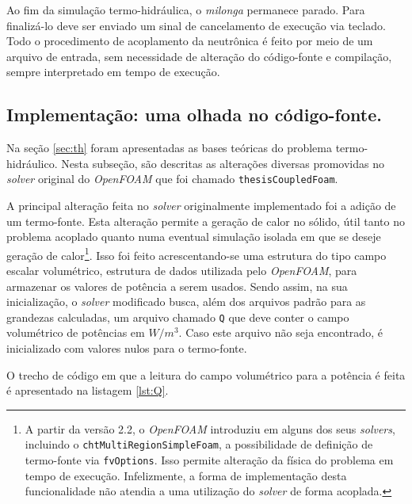 Ao fim da simulação termo-hidráulica, o \textit{milonga} permanece parado. Para finalizá-lo deve ser enviado um sinal de
cancelamento de execução via teclado. Todo o procedimento de acoplamento da neutrônica é feito por meio de um arquivo
de entrada, sem necessidade de alteração do código-fonte e compilação, sempre interpretado em tempo de execução.

\subsection{Implementação: uma olhada no código-fonte.}
\label{subsec:detth}
Na seção \ref{sec:th} foram apresentadas as bases teóricas do problema termo-hidráulico.
Nesta subseção, são
descritas as alterações diversas promovidas no \textit{solver} original do \textit{OpenFOAM}
que foi chamado \texttt{thesisCoupledFoam}.

A principal alteração feita no \textit{solver} originalmente implementado foi a adição de um termo-fonte.
Esta alteração permite a geração de calor no sólido, útil tanto no problema acoplado
quanto numa eventual simulação isolada em que se deseje geração de
calor\footnote{A partir da versão 2.2, o \textit{OpenFOAM} introduziu em alguns dos seus
\textit{solvers}, incluindo o \texttt{chtMultiRegionSimpleFoam}, a possibilidade de definição
de termo-fonte via \texttt{fvOptions}. Isso permite alteração da física do problema em
tempo de execução. Infelizmente, a forma de implementação desta funcionalidade não atendia a uma
utilização do \textit{solver} de forma acoplada.}. Isso foi feito acrescentando-se uma estrutura
do tipo campo escalar volumétrico, estrutura de dados utilizada pelo \textit{OpenFOAM},
para armazenar os valores de potência a serem usados. Sendo assim, na sua inicialização,
o \textit{solver} modificado busca, além dos arquivos padrão para as grandezas calculadas, um
arquivo chamado \texttt{Q} que deve conter o campo volumétrico de potências em $W/m^3$. Caso
este arquivo não seja encontrado, é inicializado com valores nulos para o termo-fonte.

O trecho de código em que a leitura do campo volumétrico para a potência é feita
é apresentado na listagem \ref{lst:Q}.

